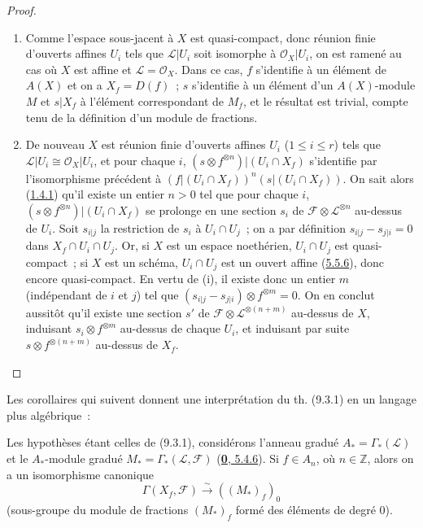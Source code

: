 \begin{proof}
\begin{enumerate}
\item[(i)] Comme l'espace sous-jacent à $X$ est quasi-compact, donc réunion
finie d'ouverts affines $U_i$ tels que $\mathscr{L}|U_i$ soit isomorphe à
$\mathscr{O}_X|U_i$, on est ramené au cas où $X$ est affine et
$\mathscr{L}=\mathscr{O}_X$. Dans ce cas, $f$ s'identifie à un élément de
$A(X)$ et on a $X_f=D(f)$~; $s$ s'identifie à un élément d'un
$A(X)$-module $M$ et $s|X_f$ à l'élément correspondant de $M_f$, et le
résultat est trivial, compte tenu de la définition d'un module de fractions.

\item[(ii)] De nouveau $X$ est réunion finie d'ouverts affines $U_i$
($1\leq i\leq r$) tels que $\mathscr{L}|U_i\cong\mathscr{O}_X|U_i$, et pour
chaque $i$,
$(s\otimes f^{\otimes n})|(U_i\cap X_f)$ s'identifie par l'isomorphisme
précédent à
$(f|(U_i\cap X_f))^n(s|(U_i\cap X_f))$. On sait alors
(\hyperref[I.1.4.1-fr]{1.4.1}) qu'il existe un entier $n>0$ tel que pour
chaque $i$, $(s\otimes f^{\otimes n})|(U_i\cap X_f)$ se prolonge en une
section $s_i$ de $\mathscr{F}\otimes\mathscr{L}^{\otimes n}$ au-dessus de
$U_i$. Soit $s_{i|j}$ la restriction de $s_i$ à $U_i\cap U_j$~; on a par
définition $s_{i|j}-s_{j|i}=0$ dans $X_f\cap U_i\cap U_j$. Or, si $X$ est un
espace noethérien, $U_i\cap U_j$ est quasi-compact~; si $X$ est un schéma,
$U_i\cap U_j$ est un ouvert affine
(\hyperref[I.5.5.6-fr]{5.5.6}), donc encore quasi-compact. En vertu de (i),
il existe donc un entier $m$ (indépendant de $i$ et $j$) tel que
$(s_{i|j}-s_{j|i})\otimes f^{\otimes m}=0$. On en conclut aussitôt qu'il
existe une section $s'$ de
$\mathscr{F}\otimes\mathscr{L}^{\otimes(n+m)}$ au-dessus de $X$, induisant
$s_i\otimes f^{\otimes m}$ au-dessus de chaque $U_i$, et induisant par suite
$s\otimes f^{\otimes(n+m)}$ au-dessus de $X_f$.
\end{enumerate}
\end{proof}

Les corollaires qui suivent donnent une interprétation du th. (9.3.1) en un
langage plus algébrique~:

\begin{corollary}[9.3.2]
\label{I.9.3.2-fr}
Les hypothèses étant celles de \textup{(9.3.1)}, considérons l'anneau gradué
$A_* = \Gamma_*(\mathscr{L})$ et le $A_*$-module gradué
$M_* = \Gamma_*(\mathscr{L},\mathscr{F})$
\textup{(\hyperref[0.5.4.6-fr]{\textbf{0}, 5.4.6})}. Si $f\in A_n$, où $n\in\mathbb{Z}$, alors
on a un isomorphisme canonique
\[
  \Gamma(X_f,\mathscr{F})\xrightarrow{\sim}((M_*)_f)_0
\]
\textup{(sous-groupe du module de fractions $(M_*)_f$ formé des éléments de degré
$0$)}.
\end{corollary}


